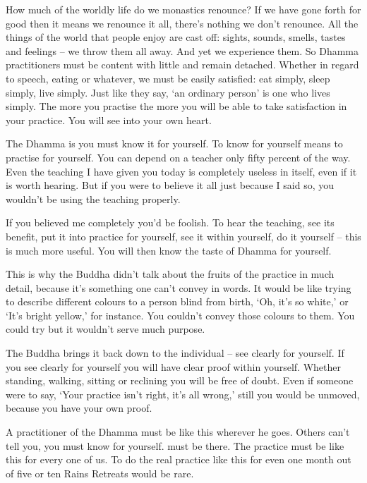 How much of the worldly life do we monastics renounce? If we have gone forth for good then it means we renounce it all, there's nothing we don't renounce. All the things of the world that people enjoy are cast off: sights, sounds, smells, tastes and feelings -- we throw them all away. And yet we experience them. So Dhamma practitioners must be content with little and remain detached. Whether in regard to speech, eating or whatever, we must be easily satisfied: eat simply, sleep simply, live simply. Just like they say, `an ordinary person' is one who lives simply. The more you practise the more you will be able to take satisfaction in your practice. You will see into your own heart. 

The Dhamma is  you must know it for yourself. To know for yourself means to practise for yourself. You can depend on a teacher only fifty percent of the way. Even the teaching I have given you today is \mbox{completely} useless in itself, even if it is worth hearing. But if you were to believe it all just because I said so, you wouldn't be using the teaching properly. 

If you believed me completely you'd be foolish. To hear the teaching, see its benefit, put it into practice for yourself, see it within yourself, do it yourself -- this is much more useful. You will then know the taste of Dhamma for yourself. 

This is why the Buddha didn't talk about the fruits of the practice in much detail, because it's something one can't convey in words. It would be like trying to describe different colours to a person blind from birth, `Oh, it's so white,' or `It's bright yellow,' for instance. You couldn't convey those colours to them. You could try but it wouldn't serve much purpose. 

The Buddha brings it back down to the individual -- see clearly for yourself. If you see clearly for yourself you will have clear proof within yourself. Whether standing, walking, sitting or reclining you will be free of doubt. Even if someone were to say, `Your practice isn't right, it's all wrong,' still you would be unmoved, because you have your own proof. 

A practitioner of the Dhamma must be like this wherever he goes. Others can't tell you, you must know for yourself.  must be there. The practice must be like this for every one of us. To do the real practice like this for even one month out of five or ten Rains Retreats would be rare. 

